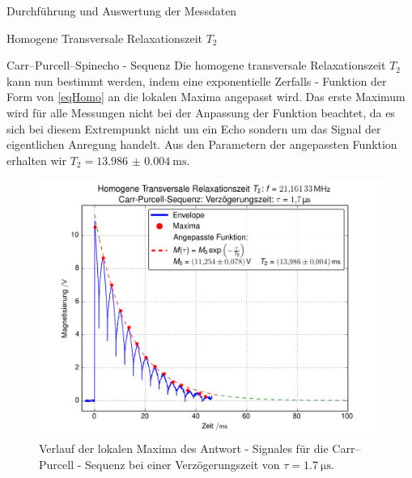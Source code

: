 \documentclass[pdftex, a4paper,11pt, twoside, ngerman]{report}
\begin{document}
\begin{chapter}{Durchführung und Auswertung der Messdaten}
\begin{section}{
        Homogene Transversale Relaxationszeit $T_{2}$}
\begin{subsection}{Carr--Purcell--Spinecho - Sequenz}
        Die homogene transversale Relaxationszeit $T_{2}$ kann nun bestimmt
        werden, indem eine exponentielle Zerfalls - Funktion der Form
        von \cref{eqHomo} an die lokalen Maxima angepasst wird.
        Das erste Maximum wird für alle Messungen nicht bei der Anpassung der
        Funktion beachtet, da es sich bei diesem Extrempunkt nicht um ein
        Echo sondern um das Signal der eigentlichen Anregung handelt.
        Aus den Parametern der angepassten Funktion erhalten wir
        $T_{2}=\SI{13.986(4)}{\milli\second}$.
        \begin{figure}[htb]
          \centering
          \includegraphics[width=\textwidth]
          {Figures/HomoTransRelax_Carr0.png}
          \caption{Verlauf der lokalen Maxima des Antwort - Signales für die
            Carr--Purcell - Sequenz bei einer Verzögerungszeit von
            $\tau = \SI{1.7}{\micro\second}$.}
          \label{figCarrBsp}
        \end{figure}
        

\end{subsection}
\end{section}
\end{chapter}
\end{document}
